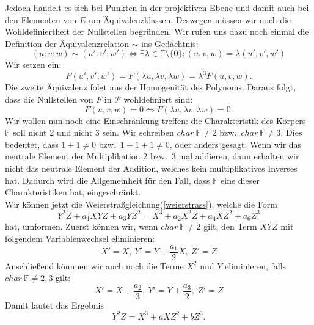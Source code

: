\documentclass[hidelinks]{article}
\theoremstyle{plain}
\theoremstyle{definition}
\theoremstyle{rem}
\newcommand{\fnz}{\mathbb{F}\setminus\{0\}}
\begin{document}
\begin{sloppypar}
Jedoch handelt es sich bei Punkten in der projektiven Ebene und damit auch bei den Elementen von $E$ um Äquivalenzklassen. Deswegen müssen wir noch die Wohldefiniertheit der Nullstellen begründen. 
Wir rufen uns dazu noch einmal die Definition der Äquivalenzrelation $\sim$ ins Gedächtnis: 
\begin{equation*}
	(u:v:w) \sim (u':v':w') \Leftrightarrow \exists \lambda \in \fnz: (u,v,w) = \lambda (u',v',w')
\end{equation*}
Wir setzen ein:
\begin{equation*}
    F(u',v',w') = F(\lambda u, \lambda v, \lambda w) = \lambda^3 F(u,v,w).
\end{equation*}
Die zweite Äquivalenz folgt aus der Homogenität des Polynoms. Daraus folgt, dass die Nullstellen von $F$ in $\mathcal{P}$ wohldefiniert sind:
\begin{equation*}
    F(u,v,w) = 0 \Leftrightarrow F(\lambda u, \lambda v, \lambda w) = 0.
\end{equation*}
Wir wollen nun noch eine Einschränkung treffen: die Charakteristik des Körpers $\mathbb{F}$ soll nicht 2 und nicht 3 sein. Wir schreiben $char \: \mathbb{F} \neq 2$ bzw.\ $char \: \mathbb{F} \neq 3$. 
Dies bedeutet, dass $1 + 1 \neq 0$ bzw.\ $1 + 1 + 1 \neq 0$, oder anders gesagt: Wenn wir das neutrale Element der Multiplikation 2 bzw.\ 3 mal addieren, dann erhalten wir nicht das neutrale Element der Addition, welches kein multiplikatives Inverses hat. 
Dadurch wird die Allgemeinheit für den Fall, dass $\mathbb{F}$ eine dieser Charakteristiken hat, eingeschränkt. \\
\newline
Wir können jetzt die Weierstraßgleichung(\ref{weierstrass}), welche die Form
\begin{equation*}
    Y^2Z + a_1XYZ + a_3YZ^2 = X^3 + a_2X^2Z + a_4XZ^2 + a_6Z^3
\end{equation*}
hat, umformen. Zuerst können wir, wenn $char \: \mathbb{F} \neq 2$ gilt, den Term $XYZ$ mit folgendem Variablenwechsel eliminieren:
\begin{equation*}
    X' = X, \: Y' = Y + \frac{a_1}{2} X, \: Z' = Z 
\end{equation*}
Anschließend könnnen wir auch noch die Terme $X^2$ und $Y$ eliminieren, falls $char \: \mathbb{F} \neq 2,3$ gilt:
\begin{equation*}
    X' = X + \frac{a_2}{3}, \: Y' = Y + \frac{a_3}{2}, \: Z' = Z
\end{equation*}
Damit lautet das Ergebnis
\begin{equation} \label{reduziert-weierstrass}
    Y^2Z = X^3 + aXZ^2 + bZ^3.
\end{equation}

\end{sloppypar}
\end{document}
